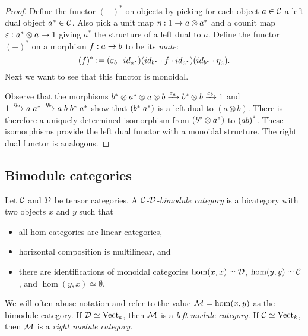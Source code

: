 \documentclass{amsart}
\begin{document}
\begin{proof}
Define the functor ${(-)^*}$ on objects by picking for each object $a \in \mathcal C$ a left dual object ${a^*} \in \mathcal C$.  Also pick a unit map $\eta: 1 \rightarrow a \otimes {a^*}$ and a counit map  $\varepsilon: {a^*} \otimes a \rightarrow 1$  giving ${a^*}$ the structure of a left dual to $a$.  Define the functor ${(-)^*}$ on a morphism $f: a \rightarrow b$ to be its {\em mate}: 
\begin{equation*}
	{(f)^*} := (\varepsilon_b \cdot {id}_{{a}^*}) ({id}_{{b}^*} \cdot f \cdot {id}_{{a}^*}) ({id}_{{b}^*} \cdot \eta_a).
\end{equation*}
Next we want to see that this functor is monoidal. 
 
Observe that the morphisms ${b}^* \otimes {a}^* \otimes a \otimes b \xrightarrow{\varepsilon_a} {b}^* \otimes b \xrightarrow{\varepsilon_b} 1$ and $1 \xrightarrow{\eta_a} a \; {a}^* \xrightarrow{\eta_b} a \; b \; {b}^* \; {a}^*$ show that $({b}^* \; {a}^*)$ is a left dual to $(a \otimes b)$.  There is therefore a uniquely determined isomorphism from $({b}^* \otimes {a}^*)$ to ${(a b)}^*$.  These isomorphisms provide the left dual functor with a monoidal structure.  The right dual functor is analogous.  %
\end{proof}


\subsection{Bimodule categories}

\begin{definition}
	Let $\mathcal C$ and $\mathcal D$ be tensor categories. A {\em $\mathcal C$-$\mathcal D$-bimodule category} is a bicategory with two objects $x$ and $y$ such that
	\begin{itemize}
		\item all hom categories are linear categories, 
		\item horizontal composition is multilinear, and
		\item there are identifications of monoidal categories $\hom(x,x) \simeq \mathcal D$, $\hom(y,y) \simeq \mathcal C$, and $\hom(y,x) \simeq \emptyset$.
	\end{itemize}
	We will often abuse notation and refer to the value $\mathcal M = \hom(x,y)$ as the bimodule category. If $\mathcal D \simeq \mathrm{Vect}_k$, then $\mathcal M$ is a {\em left module category}. If $\mathcal C \simeq \mathrm{Vect}_k$, then $\mathcal M$ is a {\em right module category}.
\end{definition}
	
\end{document}
